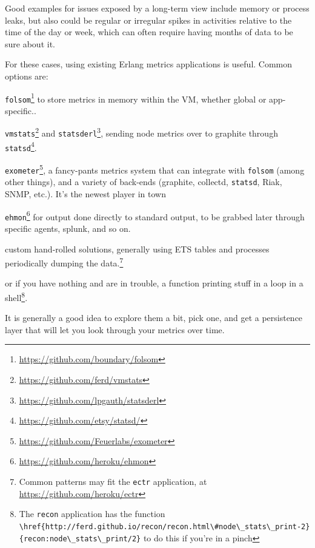 \documentclass[11pt, oneside]{book}   	%
\newcommand{\app}[1]{\Verb`#1`}
\newcommand{\otpapp}[1]{\Verb`#1`}
\newcommand{\function}[1]{\Verb`#1`}
\begin{document}
Good examples for issues exposed by a long-term view include memory or process leaks, but also could be regular or irregular spikes in activities relative to the time of the day or week, which can often require having months of data to be sure about it.

For these cases, using existing Erlang metrics applications is useful. Common options are:

\begin{itemize*}
	\item \otpapp{folsom}\footnote{\href{https://github.com/boundary/folsom}{https://github.com/boundary/folsom}} to store metrics in memory within the VM, whether global or app-specific..
	\item \otpapp{vmstats}\footnote{\href{https://github.com/ferd/vmstats}{https://github.com/ferd/vmstats}} and \otpapp{statsderl}\footnote{\href{https://github.com/lpgauth/statsderl}{https://github.com/lpgauth/statsderl}}, sending node metrics over to graphite through \app{statsd}\footnote{\href{https://github.com/etsy/statsd/}{https://github.com/etsy/statsd/}}.
	\item \otpapp{exometer}\footnote{\href{https://github.com/Feuerlabs/exometer}{https://github.com/Feuerlabs/exometer}}, a fancy-pants metrics system that can integrate with \otpapp{folsom} (among other things),  and a variety of back-ends (graphite, collectd, \app{statsd}, Riak, SNMP, etc.). It's the newest player in town
	\item \otpapp{ehmon}\footnote{\href{https://github.com/heroku/ehmon}{https://github.com/heroku/ehmon}} for output done directly to standard output, to be grabbed later through specific agents, splunk, and so on.
	\item custom hand-rolled solutions, generally using ETS tables and processes periodically dumping the data.\footnote{Common patterns may fit the \otpapp{ectr} application, at \href{https://github.com/heroku/ectr}{https://github.com/heroku/ectr}}
	\item or if you have nothing and are in trouble, a function printing stuff in a loop in a shell\footnote{The \otpapp{recon} application has the function \function{\href{http://ferd.github.io/recon/recon.html\#node\_stats\_print-2}{recon:node\_stats\_print/2}} to do this if you're in a pinch}.
\end{itemize*}

It is generally a good idea to explore them a bit, pick one, and get a persistence layer that will let you look through your metrics over time.
\end{document}
